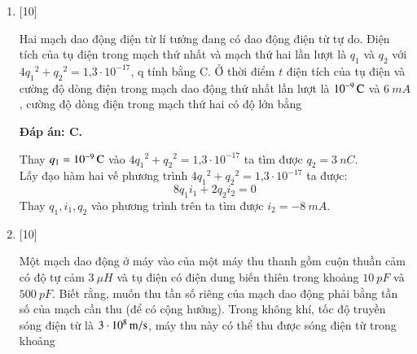 \begin{enumerate}[label=\bfseries Câu \arabic*:]
	\item {} [10]
	
	{Hai mạch dao động điện từ lí tưởng đang có dao động điện từ tự do. Điện tích của tụ điện trong mạch thứ nhất và mạch thứ hai lần lượt là $q_1$ và $q_2$ với $4{q_1}^{2}+{q_2}^{2} = \text{1,3}\cdot10^{-17}$, q tính bằng C. Ở thời điểm $t$ điện tích của tụ điện và cường độ dòng điện trong mạch dao động thứ nhất lần lượt là $\xsi{10^{-9}}{C}$ và $\SI{6}{mA}$, cường độ dòng điện trong mạch thứ hai có độ lớn bằng
	}
	
	\hideall
	{		\textbf{Đáp án: C.}
		
		Thay $q_1 = \xsi{10^{-9}}{C}$ vào $4{q_1}^{2}+{q_2}^{2} = \text{1,3}\cdot10^{-17}$ ta tìm được $q_2 = \SI{3}{nC}$. \\
		Lấy đạo hàm hai vế phương trình $4{q_1}^{2}+{q_2}^{2} = \text{1,3}\cdot10^{-17}$ ta được:
		$$
		8{q_1}{i_1} + 2{q_2}{i_2} = 0
		$$
		Thay $q_1, i_1, q_2$ vào phương trình trên ta tìm được $i_2 = \SI{-8}{mA}.$
		
	}
	
	
	
	
	\item {} [10]
	
	{Một mạch dao động ở máy vào của một máy thu thanh gồm cuộn thuần cảm có độ tự cảm $\SI{3}{\mu H}$ và tụ điện có điện dung biến thiên trong khoảng $\SI{10}{pF}$ và $\SI{500}{pF}$. Biết rằng, muốn thu tần số riêng của mạch dao động phải bằng tần số của mạch cần thu (để có cộng hưởng). Trong không khí, tốc độ truyền sóng điện từ là $\xsi{3\cdot10^{8}}{m/s}$, máy thu này có thể thu được sóng điện từ trong khoảng
	}
	

\end{enumerate}
